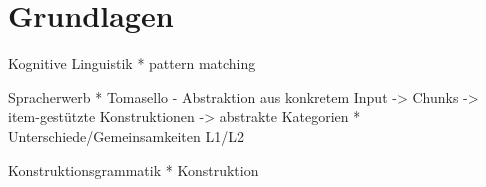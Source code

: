 \section{Grundlagen}

Kognitive Linguistik
* pattern matching

Spracherwerb
* Tomasello - Abstraktion aus konkretem Input -> Chunks -> item-gestützte Konstruktionen -> abstrakte Kategorien
* Unterschiede/Gemeinsamkeiten L1/L2

Konstruktionsgrammatik
* Konstruktion
